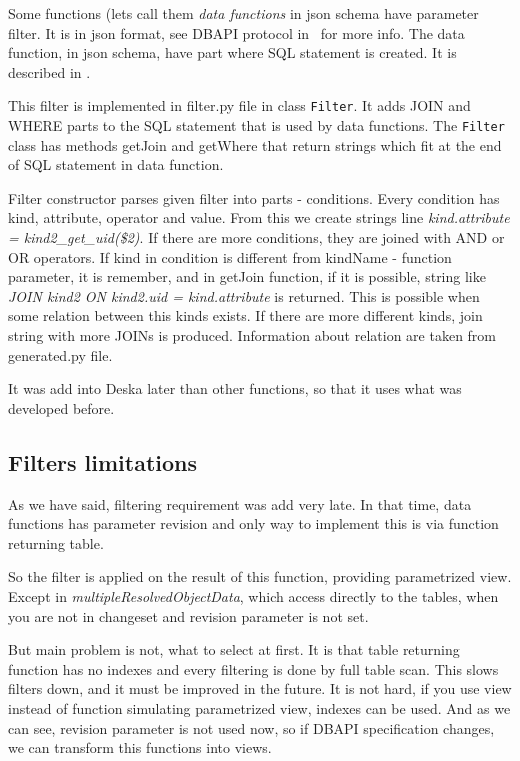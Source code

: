 \documentclass[deska]{subfiles}
\begin{document}
Some functions (lets call them {\em data functions} in json schema have parameter filter. It is in json format,
see DBAPI protocol in~ for more info.
The data function, in json schema, have part where SQL statement is created. It is described in
.

This filter is implemented in filter.py file in class {\tt Filter}.
It adds JOIN and WHERE parts to the SQL statement that is used by data functions. The {\tt Filter} class has
methods getJoin and getWhere that return strings which fit at the end of SQL statement in data function.

Filter constructor parses given filter into parts - conditions.
Every condition has kind, attribute, operator and value. From this we create strings line
{\em kind.attribute = kind2\_get\_uid(\$2)}. If there are more conditions, they are joined with AND or OR
operators.
If kind in condition is different from kindName - function parameter, it is remember,
and in getJoin function, if it is possible, string like {\em JOIN kind2 ON kind2.uid = kind.attribute}
is returned. This is possible when some relation between this kinds exists.
If there are more different kinds, join string with more JOINs is produced.
Information about relation are taken from generated.py file.

It was add into Deska later than other functions, so that it uses what was developed before.

\subsection{Filters limitations}
\label{sec:filter-speed}
As we have said, filtering requirement was add very late. In that time, data functions has parameter revision
and only way to implement this is via function returning table.

So the filter is applied on the result of this function, providing parametrized view.
Except in {\em multipleResolvedObjectData}, which access directly to the tables, when
you are not in changeset and revision parameter is not set.

But main problem is not, what to select at first. It is that table returning function has
no indexes and every filtering is done by full table scan.
This slows filters down, and it must be improved in the future. It is not hard,
if you use view instead of function simulating parametrized view, indexes can be used.
And as we can see, revision parameter is not used now, so if DBAPI specification changes,
we can transform this functions into views. 
\end{document}
